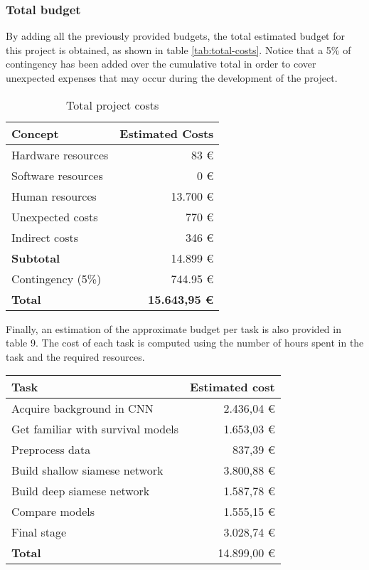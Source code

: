 \subsubsection{Total budget}

By adding all the previously provided budgets, the total estimated budget for this project
is obtained, as shown in table \autoref{tab:total-costs}. Notice that a 5\% of contingency
has been added over the cumulative total in order to cover unexpected expenses that may 
occur during the development of the project.

\begin{table}[H]
  \centering
  \begin{tabular}{|l|r|}
    \hline
    \textbf{Concept} & \textbf{Estimated Costs} \\ \hline\hline

    Hardware resources & 83 € \\ \hline
    Software resources & 0 € \\ \hline
    Human resources & 13.700 € \\ \hline
    Unexpected costs & 770 € \\ \hline
    Indirect costs & 346 € \\ \hline

    \hline\hline
    \textbf{Subtotal} & 14.899 € \\
    \hline\hline
    Contingency (5\%) & 744.95 € \\
    \hline\hline
    \textbf{Total} & \textbf{15.643,95 €} \\ \hline
  \end{tabular}

  \caption{Total project costs \label{tab:total-costs}}
\end{table}

Finally, an estimation of the approximate budget per task is also provided in table 9. The
cost of each task is computed using the number of hours spent in the task and the required
resources.

\begin{table}[H]
  \centering
  \begin{tabular}{|l|r|}
    \hline
    \textbf{Task} & \textbf{Estimated cost} \\ 
    \hline\hline

    Acquire background in CNN & 2.436,04 € \\ \hline
    Get familiar with survival models & 1.653,03 € \\ \hline
    Preprocess data & 837,39 € \\ \hline
    Build shallow siamese network & 3.800,88 € \\ \hline
    Build deep siamese network & 1.587,78 € \\ \hline
    Compare models & 1.555,15 € \\ \hline
    Final stage & 3.028,74 € \\ 

    \hline\hline
    \textbf{Total} & 14.899,00 € \\ \hline
  \end{tabular}
\end{table}


